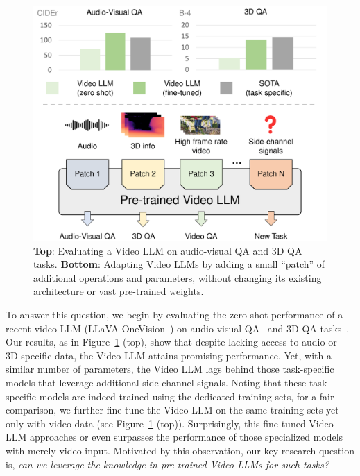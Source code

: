 \begin{figure}[t!]
    \centering
    \includegraphics[width=0.95\linewidth]{new_figure_source/pave_teaser.pdf}
    \vspace{-0.5em}
    \caption{\textbf{Top}: Evaluating a Video LLM on audio-visual QA and 3D QA tasks. \textbf{Bottom}: Adapting Video LLMs by adding a small ``patch'' of additional operations and parameters, without changing its existing architecture or vast pre-trained weights.}
    \label{fig:teaser}
    \vspace{-1.5em}
\end{figure}


To answer this question, we begin by evaluating the zero-shot performance of a recent video LLM (LLaVA-OneVision~\cite{li2024llava}) on audio-visual QA~\cite{alamri2019audiovisualsceneawaredialog} and 3D QA tasks~\cite{azuma_2022_CVPR}. Our results, as in Figure~\ref{fig:teaser} (top), show that despite lacking access to audio or 3D-specific data, the Video LLM attains promising performance. Yet, with a similar number of parameters, the Video LLM lags behind those task-specific models that leverage additional side-channel signals. Noting that these task-specific models are indeed trained using the dedicated training sets, for a fair comparison, we further fine-tune the Video LLM on the same training sets yet only with video data (see Figure~\ref{fig:teaser} (top)). Surprisingly, this fine-tuned Video LLM approaches or even surpasses the performance of those specialized models with merely video input. 
Motivated by this observation, our key research question is, \textit{can we leverage the knowledge in pre-trained Video LLMs for such tasks?}

